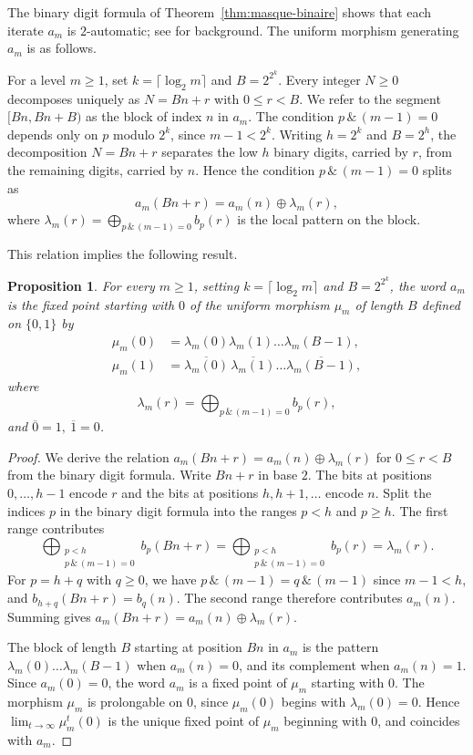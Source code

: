\documentclass[12pt,reqno]{article}
\theoremstyle{plain}
\newtheorem{proposition}[theorem]{Proposition}
\theoremstyle{definition}
\begin{document}
The binary digit formula of Theorem~\ref{thm:masque-binaire} shows that each iterate $a_m$ is $2$-automatic; see \cite{AlloucheShallit2003} for background. The uniform morphism generating $a_m$ is as follows.

For a level $m \ge 1$, set $k = \lceil \log_2 m \rceil$ and $B = 2^{2^k}$. Every integer $N \ge 0$ decomposes uniquely as $N = Bn + r$ with $0 \le r < B$. We refer to the segment $[Bn, Bn + B)$ as the block of index $n$ in $a_m$.
The condition $p\,\&\,(m-1)=0$ depends only on $p$ modulo $2^k$, since $m-1<2^k$. Writing $h=2^k$ and $B=2^h$, the decomposition $N=Bn+r$ separates the low $h$ binary digits, carried by $r$, from the remaining digits, carried by $n$. Hence the condition $p\,\&\,(m-1)=0$ splits as
\[
  a_m(Bn+r)=a_m(n)\oplus \lambda_m(r),
\]
where $\lambda_m(r) = \bigoplus_{p\,\&\,(m-1)=0} b_p(r)$ is the local pattern on the block.

This relation implies the following result.

\begin{proposition}
For every $m \ge 1$, setting $k = \lceil \log_2 m \rceil$ and $B = 2^{2^k}$, the word $a_m$ is the fixed point starting with $0$ of the uniform morphism $\mu_m$ of length $B$ defined on $\{0,1\}$ by
\begin{align*}
  \mu_m(0) &= \lambda_m(0)\lambda_m(1)\dots\lambda_m(B-1), \\
  \mu_m(1) &= \overline{\lambda_m(0)}\,\overline{\lambda_m(1)}\dots\overline{\lambda_m(B-1)},
\end{align*}
where
\[
  \lambda_m(r)=\bigoplus_{p\,\&\,(m-1)=0} b_p(r),
\]
and \(\overline{0}=1,\ \overline{1}=0\).
\end{proposition}

\begin{proof}
We derive the relation $a_m(Bn + r) = a_m(n) \oplus \lambda_m(r)$ for $0 \le r < B$ from the binary digit formula. Write $Bn + r$ in base $2$. The bits at positions $0, \dots, h - 1$ encode $r$ and the bits at positions $h, h+1, \dots$ encode $n$. Split the indices $p$ in the binary digit formula into the ranges $p < h$ and $p \ge h$. The first range contributes
\[
  \bigoplus_{\substack{p < h \\ p\,\&\,(m-1) = 0}} b_p(Bn + r) = \bigoplus_{\substack{p < h \\ p\,\&\,(m-1) = 0}} b_p(r) = \lambda_m(r).
\]
For $p = h + q$ with $q \ge 0$, we have $p \,\&\, (m-1) = q \,\&\, (m-1)$ since $m - 1 < h$, and $b_{h + q}(Bn + r) = b_q(n)$. The second range therefore contributes $a_m(n)$. Summing gives $a_m(Bn + r) = a_m(n) \oplus \lambda_m(r)$.

The block of length $B$ starting at position $Bn$ in $a_m$ is the pattern $\lambda_m(0) \dots \lambda_m(B-1)$ when $a_m(n) = 0$, and its complement when $a_m(n) = 1$. Since $a_m(0) = 0$, the word $a_m$ is a fixed point of $\mu_m$ starting with $0$. The morphism $\mu_m$ is prolongable on $0$, since $\mu_m(0)$ begins with $\lambda_m(0) = 0$. Hence $\lim_{t \to \infty} \mu_m^t(0)$ is the unique fixed point of $\mu_m$ beginning with $0$, and coincides with $a_m$.
\end{proof}
\end{document}

